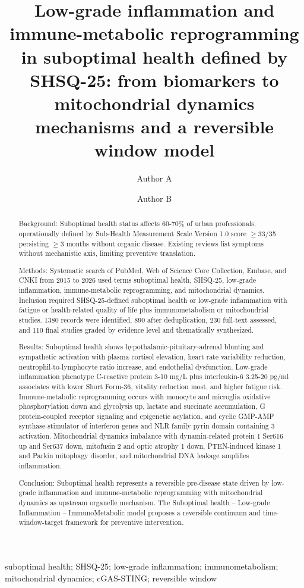\documentclass[review]{elsarticle}
\begin{document}
\begin{frontmatter}
\title{Low-grade inflammation and immune-metabolic reprogramming in suboptimal health defined by SHSQ-25: from biomarkers to mitochondrial dynamics mechanisms and a reversible window model}
\author[aff1]{Author A}
\author[aff1]{Author B}
\address[aff1]{Affiliation, City, Country}
\begin{abstract}
Background: Suboptimal health status affects 60-70\% of urban professionals, operationally defined by Sub-Health Measurement Scale Version 1.0 score $\geq$33/35 persisting $\geq$3 months without organic disease. Existing reviews list symptoms without mechanistic axis, limiting preventive translation.

Methods: Systematic search of PubMed, Web of Science Core Collection, Embase, and CNKI from 2015 to 2026 used terms suboptimal health, SHSQ-25, low-grade inflammation, immune-metabolic reprogramming, and mitochondrial dynamics. Inclusion required SHSQ-25-defined suboptimal health or low-grade inflammation with fatigue or health-related quality of life plus immunometabolism or mitochondrial studies. 1380 records were identified, 890 after deduplication, 230 full-text assessed, and 110 final studies graded by evidence level and thematically synthesized.

Results: Suboptimal health shows hypothalamic-pituitary-adrenal blunting and sympathetic activation with plasma cortisol elevation, heart rate variability reduction, neutrophil-to-lymphocyte ratio increase, and endothelial dysfunction. Low-grade inflammation phenotype C-reactive protein 3-10 mg/L plus interleukin-6 3.25-20 pg/ml associates with lower Short Form-36, vitality reduction most, and higher fatigue risk. Immune-metabolic reprogramming occurs with monocyte and microglia oxidative phosphorylation down and glycolysis up, lactate and succinate accumulation, G protein-coupled receptor signaling and epigenetic acylation, and cyclic GMP-AMP synthase-stimulator of interferon genes and NLR family pyrin domain containing 3 activation. Mitochondrial dynamics imbalance with dynamin-related protein 1 Ser616 up and Ser637 down, mitofusin 2 and optic atrophy 1 down, PTEN-induced kinase 1 and Parkin mitophagy disorder, and mitochondrial DNA leakage amplifies inflammation.

Conclusion: Suboptimal health represents a reversible pre-disease state driven by low-grade inflammation and immune-metabolic reprogramming with mitochondrial dynamics as upstream organelle mechanism. The Suboptimal health -- Low-grade Inflammation -- ImmunoMetabolic model proposes a reversible continuum and time-window-target framework for preventive intervention.
\end{abstract}
\begin{keyword}
suboptimal health; SHSQ-25; low-grade inflammation; immunometabolism; mitochondrial dynamics; cGAS-STING; reversible window
\end{keyword}
\end{frontmatter}
\end{document}
